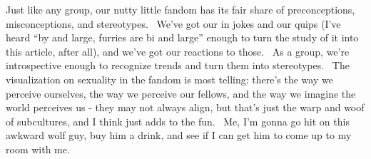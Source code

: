 Just like any group, our nutty little fandom has its fair share of
preconceptions, misconceptions, and stereotypes. ~We've got our in jokes
and our quips (I've heard ``by and large, furries are bi and large''
enough to turn the study of it into this article, after all), and we've
got our reactions to those. ~As a group, we're introspective enough to
recognize trends and turn them into stereotypes. ~The visualization on
sexuality in the fandom is most telling: there's the way we perceive
ourselves, the way we perceive our fellows, and the way we imagine the
world perceives us - they may not always align, but that's just the warp
and woof of subcultures, and I think just adds to the fun. ~Me, I'm
gonna go hit on this awkward wolf guy, buy him a drink, and see if I can
get him to come up to my room with me.
